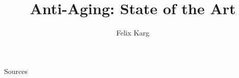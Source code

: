 \usepackage[ngerman, english]{babel}


\title{Anti-Aging: State of the Art}
\author{Felix Karg}


\graphicspath{ {./img/} {../template/} {../template_tex/} } %

\newif\iftwocols
\twocolsfalse





\newif\ifonline
\onlinefalse















\begin{frame}{Sources}
% 


\end{frame}

% 


